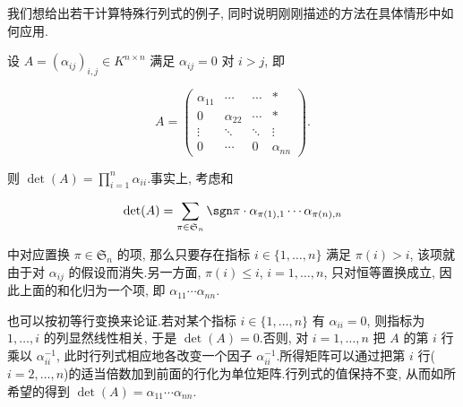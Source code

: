 我们想给出若干计算特殊行列式的例子, 同时说明刚刚描述的方法在具体情形中如何应用.

\begin{bsp}\label{bsp:4.3.1}
设 $A = (\alpha_{ij})_{i, j} \in K^{n \times n}$ 满足 $\alpha_{ij} = 0$ 对 $i > j$, 即

\[
A = \begin{pmatrix} \alpha_{11} & \cdots & \cdots & * \\ 0 & \alpha_{22} & \cdots & * \\ \vdots & \ddots & \ddots & \vdots \\ 0 & \cdots & 0 & \alpha_{nn} \end{pmatrix}.
\]

则 $\det(A) = \prod_{i = 1}^{n} \alpha_{ii}$.事实上, 考虑和

\[
\det(A) = \sum_{\pi \in \mathfrak{S}_n} \sgn \pi \cdot \alpha_{\pi(1), 1} \cdots \alpha_{\pi(n), n}
\]

中对应置换 $\pi \in \mathfrak{S}_n$ 的项, 那么只要存在指标 $i \in \{1, \ldots, n\}$ 满足 $\pi(i) > i$, 该项就由于对 $\alpha_{ij}$ 的假设而消失.另一方面, $\pi(i) \leq i$, $i = 1, \ldots, n$, 只对恒等置换成立, 因此上面的和化归为一个项, 即 $\alpha_{11} \cdots \alpha_{nn}$.

也可以按初等行变换来论证.若对某个指标 $i \in \{1, \ldots, n\}$ 有 $\alpha_{ii} = 0$, 则指标为 $1, \ldots, i$ 的列显然线性相关, 于是 $\det(A) = 0$.否则, 对 $i = 1, \ldots, n$ 把 $A$ 的第 $i$ 行乘以 $\alpha_{ii}^{-1}$, 此时行列式相应地各改变一个因子 $\alpha_{ii}^{-1}$.所得矩阵可以通过把第 $i$ 行($i = 2, \ldots, n$)的适当倍数加到前面的行化为单位矩阵.行列式的值保持不变, 从而如所希望的得到 $\det(A) = \alpha_{11} \cdots \alpha_{nn}$.
\end{bsp}


